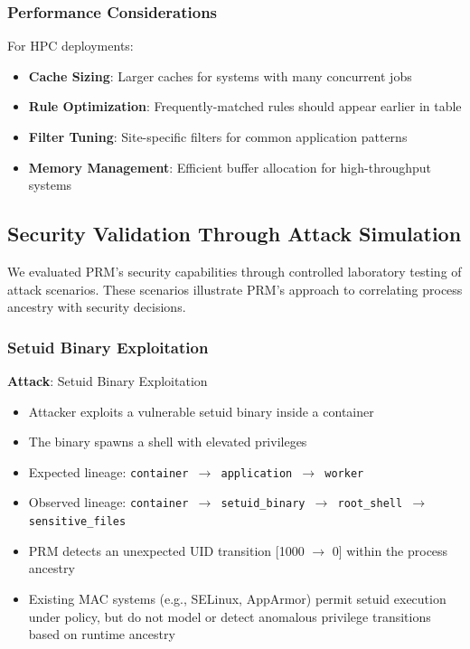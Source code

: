 \documentclass[]{sn-jnl}
\begin{document}
\subsubsection{Performance Considerations}

For HPC deployments:
\begin{itemize}
\item \textbf{Cache Sizing}: Larger caches for systems with many concurrent jobs
\item \textbf{Rule Optimization}: Frequently-matched rules should appear earlier
      in table
\item \textbf{Filter Tuning}: Site-specific filters for common application patterns
\item \textbf{Memory Management}: Efficient buffer allocation for high-throughput
      systems
\end{itemize}

\subsection{Security Validation Through Attack Simulation}
\label{sec:security_validation}

We evaluated PRM's security capabilities through controlled laboratory testing of
attack scenarios. These scenarios illustrate PRM's approach to correlating process
ancestry with security decisions.

\subsubsection{Setuid Binary Exploitation}

\textbf{Attack}: Setuid Binary Exploitation
\begin{itemize}
\item Attacker exploits a vulnerable setuid binary inside a container
\item The binary spawns a shell with elevated privileges
\item Expected lineage: \texttt{container $\rightarrow$ application $\rightarrow$ worker}
\item Observed lineage: \texttt{container $\rightarrow$ setuid\_binary $\rightarrow$ root\_shell $\rightarrow$ sensitive\_files}
\item PRM detects an unexpected UID transition [1000 $\rightarrow$ 0] within the
      process ancestry
\item Existing MAC systems (e.g., SELinux, AppArmor) permit setuid execution under
      policy, but do not model or detect anomalous privilege transitions based on
      runtime ancestry
\end{itemize}
\end{document}
